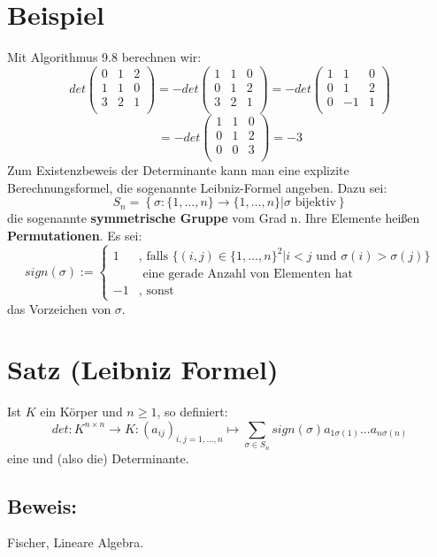 \documentclass{scrbook}
\begin{document}
\section{Beispiel}
Mit Algorithmus 9.8 berechnen wir:
\[det\left(
\begin{array}{ccc}
0&1&2\\
1&1&0\\
3&2&1\\
\end{array}
\right) = -det\left(
\begin{array}{ccc}
1&1&0\\
0&1&2\\
3&2&1\\
\end{array}
\right) =-det\left(
\begin{array}{ccc}
1&1&0\\
0&1&2\\
0&-1&1\\
\end{array}
\right) \]
\[=-det\left(
\begin{array}{ccc}
1&1&0\\
0&1&2\\
0&0&3\\
\end{array}
\right) = -3 \]
Zum Existenzbeweis der Determinante kann man eine explizite Berechnungsformel, die sogenannte Leibniz-Formel angeben. Dazu sei:\[S_n = \left\{ \sigma : \{1,...,n\} \to \{1,...,n\} \left| \sigma \text{ bijektiv}\right.\right\}\]
die sogenannte \textbf{symmetrische Gruppe} vom Grad n. Ihre Elemente heißen \textbf{Permutationen}. Es sei:
\[sign(\sigma):= \left\{
\begin{array}{ll}
1& \text{, falls } \{(i,j) \in \{1,...,n\}^2| i<j \text{ und } \sigma(i) > \sigma (j)\}\\&\text{ eine gerade Anzahl von Elementen hat}\\
-1&\text{, sonst}
\end{array}
\right.\]
das Vorzeichen von $\sigma$.
\section{Satz (Leibniz Formel)}
Ist $K$ ein Körper und $n \geq 1$, so definiert:\[det:K^{n\times n}\to K: (a_{ij})_{i,j=1,...,n} \mapsto \sum_{\sigma \in S_n} sign(\sigma) a_{1\sigma(1)}...a_{n\sigma(n)}\]
eine und (also die) Determinante.
\subsection*{Beweis:}
Fischer, Lineare Algebra.
\end{document}
